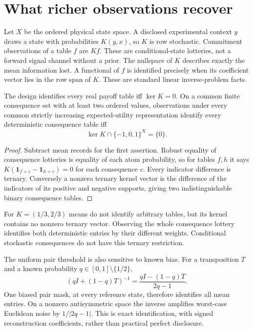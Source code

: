 \section{What richer observations recover}
Let $X$ be the ordered physical state space. A disclosed experimental context
$y$ draws a state with probabilities $K(y,x)$, so $K$ is row stochastic.
Commitment observations of a table $f$ are $Kf$. These are conditional-state
lotteries, not a forward signal channel without a prior. The nullspace of
$K$ describes exactly the mean information lost. A functional of $f$ is
identified precisely when its coefficient vector lies in the row span of $K$.
These are standard linear inverse-problem facts.

\begin{proposition}
The design identifies every real payoff table iff $\ker K=0$. On a common
finite consequence set with at least two ordered values, observations under
every common strictly increasing expected-utility representation identify
every deterministic consequence table iff
\[
 \ker K\cap\{-1,0,1\}^{X}=\{0\}.
\]
\end{proposition}
\begin{proof}
Subtract mean records for the first assertion. Robust equality of consequence
lotteries is equality of each atom probability, so for tables $f,h$ it says
$K(\mathbf1_{f=c}-\mathbf1_{h=c})=0$ for each consequence $c$.
Every indicator difference is ternary. Conversely a nonzero ternary kernel
vector is the difference of the indicators of its positive and negative
supports, giving two indistinguishable binary consequence tables.
\end{proof}
For $K=(1/3,2/3)$ means do not identify arbitrary tables, but its kernel
contains no nonzero ternary vector. Observing the whole consequence lottery
identifies both deterministic entries by their different weights. Conditional
stochastic consequences do not have this ternary restriction.

The uniform pair threshold is also sensitive to known bias. For a
transposition $T$ and a known probability $q\in[0,1]\setminus\{1/2\}$,
\[
 (qI+(1-q)T)^{-1}=\frac{qI-(1-q)T}{2q-1}.
\]
One biased pair mask, at every reference state, therefore identifies all mean
entries. On a nonzero antisymmetric space the inverse amplifies worst-case
Euclidean noise by $1/|2q-1|$. This is exact identification, with signed
reconstruction coefficients, rather than practical perfect disclosure.

